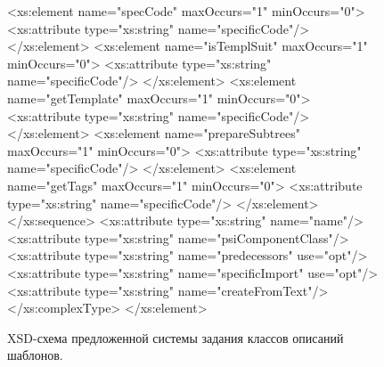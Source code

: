 \documentclass{matmex-diploma}
\begin{document}
\begin{figure}[H]
    \begin{pyglist}[language=xml]
        <xs:element name="specCode" maxOccurs="1" minOccurs="0">
          <xs:attribute type="xs:string" name="specificCode"/>
        </xs:element>
        <xs:element name="isTemplSuit" maxOccurs="1" minOccurs="0">
          <xs:attribute type="xs:string" name="specificCode"/>
        </xs:element>
        <xs:element name="getTemplate" maxOccurs="1" minOccurs="0">
          <xs:attribute type="xs:string" name="specificCode"/>
        </xs:element>
        <xs:element name="prepareSubtrees" maxOccurs="1" minOccurs="0">
          <xs:attribute type="xs:string" name="specificCode"/>
        </xs:element>
        <xs:element name="getTags" maxOccurs="1" minOccurs="0">
          <xs:attribute type="xs:string" name="specificCode"/>
        </xs:element>
      </xs:sequence>
      <xs:attribute type="xs:string" name="name"/>
      <xs:attribute type="xs:string" name="psiComponentClass"/>
      <xs:attribute type="xs:string" name="predecessors" use="opt"/>
      <xs:attribute type="xs:string" name="specificImport" use="opt"/>
      <xs:attribute type="xs:string" name="createFromText"/>
    </xs:complexType>
  </xs:element>
    \end{pyglist}
\caption{XSD-схема предложенной системы задания классов описаний шаблонов.}    
\label{XSD-scheme}
\end{figure}
\end{document}
